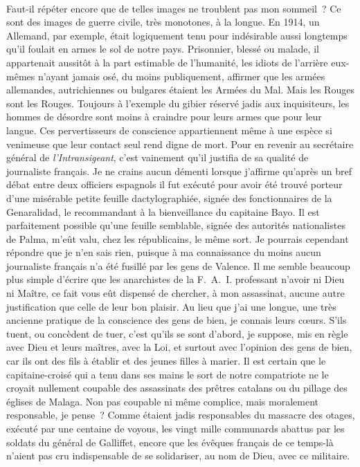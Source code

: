 \documentclass[french,twoside]{book} %
\begin{document}
\noindent  \par
Faut-il répéter encore que de telles images ne troublent pas mon sommeil ? Ce sont des images de guerre civile, très monotones, à la longue. En 1914, un Allemand, par exemple, était logiquement tenu pour indésirable aussi longtemps qu’il foulait en armes le sol de notre pays. Prisonnier, blessé ou malade, il appartenait aussitôt à la part estimable de l’humanité, les idiots de l’arrière eux-mêmes n’ayant jamais osé, du moins publiquement, affirmer que les armées allemandes, autrichiennes ou bulgares étaient les Armées du Mal. Mais les Rouges sont les Rouges. Toujours à l’exemple du gibier réservé jadis aux inquisiteurs, les hommes de désordre sont moins à craindre pour leurs armes que pour leur langue. Ces pervertisseurs de conscience appartiennent même à une espèce si venimeuse que leur contact seul rend digne de mort. Pour en revenir au secrétaire général de \emph{l’Intransigeant}, c’est vainement qu’il justifia de sa qualité de journaliste français. Je ne crains aucun démenti lorsque j’affirme qu’après un bref débat entre deux officiers espagnols il fut exécuté pour avoir été trouvé porteur d’une misérable petite feuille dactylographiée, signée des fonctionnaires de la Genaralidad, le recommandant à la bienveillance du capitaine Bayo. Il est parfaitement possible qu’une feuille semblable, signée des autorités nationalistes de Palma, m’eût valu, chez les républicains, le même sort. Je pourrais cependant répondre que je n’en sais rien, puisque à ma connaissance du moins aucun journaliste français n’a été fusillé par les gens de Valence. Il me semble beaucoup plus simple d’écrire que les anarchistes de la F. A. I. professant n’avoir ni Dieu ni Maître, ce fait vous eût dispensé de chercher, à mon assassinat, aucune autre justification que celle de leur bon plaisir. Au lieu que j’ai une longue, une très ancienne pratique de la conscience des gens de bien, je connais leurs cœurs. S’ils tuent, ou concèdent de tuer, c’est qu’ils se sont d’abord, je suppose, mis en règle avec Dieu et leurs maîtres, avec la Loi, et surtout avec l’opinion des gens de bien, car ils ont des fils à établir et des jeunes filles à marier. Il est certain que le capitaine-croisé qui a tenu dans ses mains le sort de notre compatriote ne le croyait nullement coupable des assassinats des prêtres catalans ou du pillage des églises de Malaga. Non pas coupable ni même complice, mais moralement responsable, je pense ? Comme étaient jadis responsables du massacre des otages, exécuté par une centaine de voyous, les vingt mille communards abattus par les soldats du général de Galliffet, encore que les évêques français de ce temps-là n’aient pas cru indispensable de se solidariser, au nom de Dieu, avec ce militaire.\par
 \par
\end{document}
